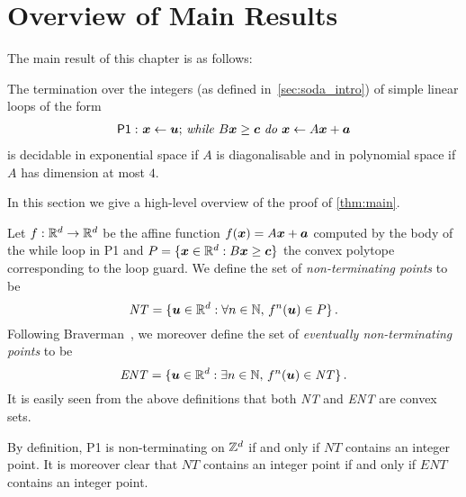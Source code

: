 \section{Overview of Main Results}
\label{sec:overview}
The main result of this chapter is as follows:
\begin{theorem}
    The termination over the integers (as defined in~\cref{sec:soda_intro})
    of simple linear loops of the form
\begin{gather*}
\mathsf{P1:}\  \mbox{$\boldsymbol{x}\gets \boldsymbol{u}$;
\textit{while} $B\boldsymbol{x} \geq \boldsymbol{c}$ \textit{do}
$\boldsymbol{x}\leftarrow A\boldsymbol{x}+\boldsymbol{a}$}
\end{gather*}
is decidable in exponential space if $A$ is diagonalisable and
in polynomial space if $A$ has dimension at most $4$.
\label{thm:main}
\end{theorem}
In this section we give a high-level overview of the proof of \cref{thm:main}.

Let $f:\mathbb{R}^{d}\rightarrow \mathbb{R}^{d}$ be the affine function
$f(\boldsymbol{x})=A\boldsymbol{x}+\boldsymbol a$ computed by the body
of the while loop in \textsf{P1} and $P=\lbrace \boldsymbol{x} \in
\mathbb{R}^{d}: B \boldsymbol{x}\geq \boldsymbol{c}\rbrace$ the convex polytope
corresponding to the loop guard.  We define the set of
\emph{non-terminating points} to be
\[ \mathit{NT} = \lbrace \boldsymbol{u}\in \mathbb{R}^{d} : \forall n \in
\mathbb{N},\, f^n(\boldsymbol{u}) \in P \rbrace \, .\] Following
Braverman~\cite{Bra06}, we moreover define the set of \emph{eventually
  non-terminating points} to be
\[ \mathit{ENT} = \lbrace \boldsymbol{u}\in \mathbb{R}^{d} : \exists n \in
\mathbb{N},\, f^n(\boldsymbol{u}) \in \mathit{NT} \rbrace \, .\]
It is easily seen from the above definitions that both \textit{NT} and
\textit{ENT} are convex sets.

By definition, \textsf{P1} is non-terminating on $\mathbb{Z}^{d}$ if
and only if $\mathit{NT}$ contains an integer point.  It is moreover
clear that $\mathit{NT}$ contains an integer point if and only if
$\mathit{ENT}$ contains an integer point.


